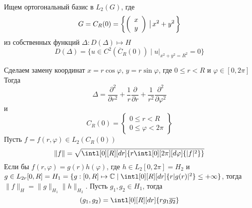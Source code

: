 \documentclass[14pt]{extarticle}
\newcommand{\vect}[2]{\left(
\begin{array}{c}
    #1\\
    #2
\end{array}\right)}
\begin{document}
Ищем ортогональный базис в $L_2(G)$, где
$$
G = C_R(0) = \left\{ \vect{x}{y} \left\arrowvert x^2 + y^2\right.\right\}
$$
из собственных функций $\Delta : D(\Delta) \mapsto H$
$$
D(\Delta) = \{u \in C^2(\overline{C}_R(0)) \mid u|_{x^2 + y^2 = R^2} = 0\}
$$

Сделаем замену координат $x = r \cos \varphi$, $y = r \sin \varphi$, где $0 \le r < R$ и
$\varphi \in [0, 2\pi]$
Тогда
$$
\Delta = \dfrac{\partial^2}{\partial r^2} + \dfrac{1}{r} \dfrac{\partial}{\partial r} + \dfrac{1}{r^2}
\dfrac{\partial^2}{\partial \varphi^2}
$$
и 
$$
C_R(0) = \left\{
\begin{array}{c}
    0 \le r < R\\
    0 \le \varphi < 2\pi
\end{array}
\right\}
$$
Пусть $f = f(r, \varphi) \in L_2(C_R(0))$
$$
\|f\| = \sqrt{\intl[0][R][dr]{r\intl[0][2\pi][d\varphi]{|f|^2}}}
$$
Если бы $f(r, \varphi) = g(r)h(\varphi)$, где $h \in L_2[0,2\pi] = H_2$
и $g \in L_{2r}[0, R] = H_1 = \{g : [0, R] \mapsto \mathbb C \mid \intl[0][R][dr]{r|g(r)|^2} \le 
+\infty\}$,
тогда $\|f\|_H = \|g\|_{H_1} \|h\|_{H_2}$.
Пусть $g_1, g_2 \in H_1$, тогда
$$
(g_1, g_2) = \intl[0][R][dr]{r g_1 \overline{g_2}}
$$
\end{document}
